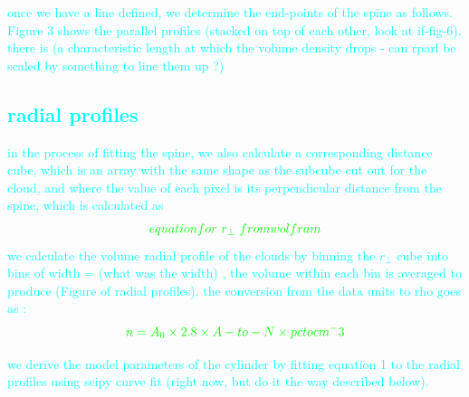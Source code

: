 \documentclass[twocolumn]{aastex631}
\newcommand{\rperp}{r_{\perp}}
\begin{document}
\textcolor{cyan}{once we have a line defined, we determine the end-points of the spine as follows. Figure 3 shows the parallel profiles (stacked on top of each other, look at if-fig-6). there is (a characteristic length at which the volume density drops - can rparl be scaled by something to line them up ?)


\subsection{radial profiles}

\textcolor{cyan}{
in the process of fitting the spine, we also calculate a corresponding distance cube, which is an array with the same shape as the subcube cut out for the cloud, and where the value of each pixel is its perpendicular distance from the spine, which is calculated as 
\begin{align}
    \textcolor{green}{equation for\ \rperp\ from wolfram}
\end{align}
we calculate the volume radial profile of the clouds by binning the $\rperp$ cube into bins of width = (what was the width) , the volume within each bin is averaged to produce (Figure of radial profiles). 
the conversion from the data units to rho goes as : 
\begin{align}
    \textcolor{green}{n = A_0 \times 2.8 \times A-to-N \times pc to cm^-3}
\end{align}}

\textcolor{cyan}{we derive the model parameters of the cylinder by fitting equation 1 to the radial profiles using scipy curve fit (right now, but do it the way described below).}



}
\end{document}
